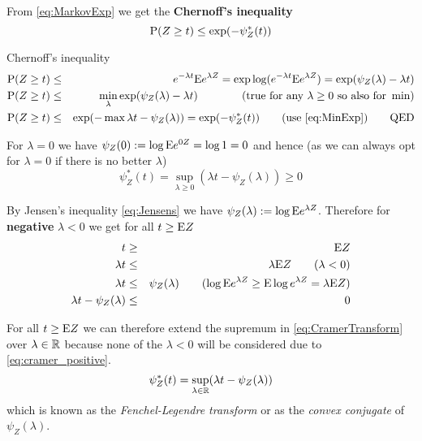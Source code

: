 From \eqref{eq:MarkovExp} we get the \textbf{Chernoff's inequality}
\begin{equation}\label{eq:Chernoff}
\mathrm{P}(Z \geq t) \leq \exp (- \psi_Z^*(t))
\end{equation}

\begin{prf}{Chernoff's inequality}
\begin{eqnarray*}
\mathrm{P}(Z \geq t) & \leq & e^{-\lambda t}\mathrm{E} e^{\lambda Z} =
\exp \log (e^{-\lambda t}\mathrm{E} e^{\lambda Z}) =
\exp (\psi_Z(\lambda) - \lambda t) \nonumber \\
\mathrm{P}(Z \geq t) & \leq & \min_\lambda \exp (\psi_Z(\lambda) - \lambda t)  \qquad  \qquad (\text{true for any } \lambda \geq 0 \text{ so also for } \min) \nonumber \\
\mathrm{P}(Z \geq t) & \leq & \exp (- \max \lambda t - \psi_Z(\lambda)) = \exp (- \psi_Z^*(t)) \qquad (\text{use } \eqref{eq:MinExp}) \qquad \text{QED}
\end{eqnarray*}
\end{prf}

For $\lambda = 0$ we have $\psi_Z(0) := \log \mathrm{E} e^{0 Z} = \log 1 = 0$ and hence (as we can always opt for $\lambda = 0$ if there is no better $\lambda$)
\begin{equation}\label{eq:cramer_positive}
\psi_Z^*(t) = \sup_{\lambda \geq 0}(\lambda t - \psi_Z(\lambda)) \geq 0
\end{equation}

By Jensen's inequality \eqref{eq:Jensens} we have $\psi_Z(\lambda) := \log \mathrm{E} e^{\lambda Z}$.
Therefore for \textbf{negative} $\lambda < 0$ we get for all $t \geq \mathrm{E}{Z}$ 
\begin{eqnarray}
t &\geq& \mathrm{E}{Z} \nonumber \\
\lambda t &\leq& \lambda \mathrm{E}{Z} \qquad (\lambda < 0) \nonumber \\
\lambda t &\leq& \psi_Z(\lambda) \qquad (\log \mathrm{E} e^{\lambda Z} \geq \mathrm{E} \log e^{\lambda Z} = \lambda \mathrm{E} Z)\nonumber \\
\lambda t - \psi_Z(\lambda) &\leq& 0
\end{eqnarray}

For all $t \geq \mathrm{E}{Z}$ we can therefore extend the supremum in \eqref{eq:CramerTransform} over $\lambda \in \mathbb{R}$ because none of the $\lambda < 0$ will be considered due to \eqref{eq:cramer_positive}.
\begin{equation}\label{eq:FenchelTransform}
\psi_Z^*(t) = \sup_{\lambda \in \mathbb{R}}(\lambda t - \psi_Z(\lambda))
\end{equation}
which is known as the \emph{Fenchel-Legendre transform} or as the \emph{convex conjugate} of $\psi_Z(\lambda)$.

